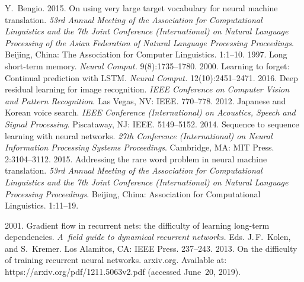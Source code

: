 \begin{multicols}{2}
{{\begin{thebibliography}{99}
{Y.~Bengio.} 2015. On using very large target vocabulary for neural machine 
translation. \textit{53rd Annual Meeting of the Association for Computational 
Linguistics and the 7th  Joint Conference (International) on Natural Language 
Processing of the Asian Federation of Natural Language Processing 
Proceedings}. Beijing, China: The Association for Computer Linguistics. 
1:1--10.
   1997. Long short-term memory. 
\textit{Neural Comput.} 9(8):1735--1780.
   2000. Learning to forget: 
Continual prediction with LSTM. \textit{Neural Comput.} 12(10):2451--2471.
   2016. Deep residual learning for 
image recognition. \textit{IEEE Conference on Computer Vision and Pattern 
Recognition}. Las Vegas, NV: IEEE. 770--778.
   2012. Japanese and Korean voice search. 
\textit{IEEE Conference (International) on Acoustics, Speech and Signal 
Processing}. Piscataway, NJ: IEEE. 5149--5152.
   2014. Sequence to sequence learning 
with neural networks. \textit{27th Conference (International) on Neural Information 
Processing Systems Proceedings}. Cambridge, MA: MIT Press. 2:3104--3112.
2015. Addressing the rare word problem in neural machine translation. \textit{53rd 
Annual Meeting of the Association for Computational Linguistics and the 7th  Joint 
Conference (International) on Natural Language Processing Proceedings}. Beijing, 
China: Association for Computational Linguistics. 1:11--19.
 
   2001. 
Gradient flow in recurrent nets: the difficulty of learning long-term dependencies. 
\textit{A~field guide to dynamical recurrent networks.} Eds. J.\,F.~Kolen, and 
S.~Kremer. Los Alamitos, CA: IEEE Press. 237--243.
   2013. On the difficulty of 
training recurrent neural networks. arxiv.org.
Available at: {\sf 
https://arxiv.org/pdf/1211.5063v2.pdf} (accessed June~20, 2019).


\end{thebibliography}}}
\end{multicols}

